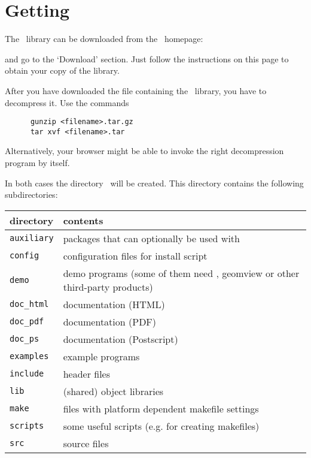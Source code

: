 \section{Getting \cgal} \label{sec:gettingcgal}

The \cgal\ library can be downloaded from the \cgal\ 
homepage:
\begin{quote}
      \cgalhomepage
\end{quote}
and go to the `Download' section. Just follow the instructions on this
page to obtain your copy of the library.

After you have downloaded the file containing the \cgal\ library, you
have to decompress it. Use the commands

\begin{verbatim}
      gunzip <filename>.tar.gz
      tar xvf <filename>.tar
\end{verbatim}

Alternatively, your browser might be able to invoke the right
decompression program by itself.

In both cases the directory \cgaldir\ will be created. This directory
contains the following subdirectories:\index{directories!structure}

\begin{center}
  \renewcommand{\arraystretch}{1.3}
  \gdef\lcTabularBorder{2}
  \begin{tabular}{|l|l|} \hline
    \textbf{directory} & \textbf{contents}\\\hline\hline
    \texttt{auxiliary} & packages that can optionally be used with \cgal\\\hline
    \texttt{config}    & configuration files for install script\\\hline
    \texttt{demo}      & demo programs (some of them need \leda, geomview
                         or other third-party products)\\\hline
    \texttt{doc\_html} & documentation (HTML)\\\hline
    \texttt{doc\_pdf}  & documentation (PDF)\\\hline
    \texttt{doc\_ps}   & documentation (Postscript)\\\hline
    \texttt{examples}  & example programs\\\hline
    \texttt{include}   & header files\\\hline
    \texttt{lib}       & (shared) object libraries\\\hline
    \texttt{make}      & files with platform dependent makefile settings\\\hline
    \texttt{scripts}   & some useful scripts (e.g. for creating makefiles)\\\hline
    \texttt{src}       & source files\\\hline
  \end{tabular}
\end{center}

